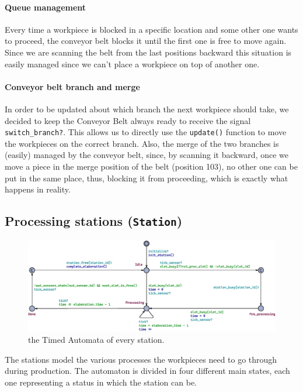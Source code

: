 \documentclass[a4paper]{article}
\begin{document}
    \paragraph{Queue management} Every time a workpiece is blocked in a specific location and some other one wants to proceed, the conveyor belt blocks it until the first one is free to move again. Since we are scanning the belt from the last positions backward this situation is easily managed since we can't place a workpiece on top of another one.

    \paragraph{Conveyor belt branch and merge} In order to be updated about which branch the next workpiece should take, we decided to keep the Conveyor Belt always ready to receive the signal \texttt{switch\_branch?}. This allows us to directly use the \texttt{update()} function to move the workpieces on the correct branch. Also, the merge of the two branches is (easily) managed by the conveyor belt, since, by scanning it backward, once we move a piece in the merge position of the belt (position 103), no other one can be put in the same place, thus, blocking it from proceeding, which is exactly what happens in reality.

    \subsection{Processing stations (\texttt{Station})}

    \begin{figure}[h!]
        \centering
        \includegraphics[width=\columnwidth]{./images/automata/station}
        \caption{the Timed Automata of every station.}
    \end{figure}

    The stations model the various processes the workpieces need to go through during production. The automaton is divided in four different main states, each one representing a status in which the station can be.
\end{document}
